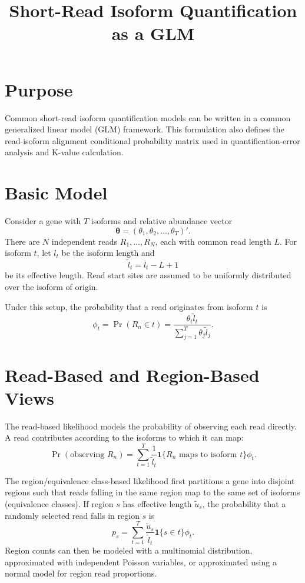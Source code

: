 \documentclass[11pt]{article}
\title{Short-Read Isoform Quantification as a GLM}
\author{}
\date{}
\begin{document}
\maketitle

\section*{Purpose}

Common short-read isoform quantification models can be written in a common
generalized linear model (GLM) framework. This formulation also defines the
read-isoform alignment conditional probability matrix used in
quantification-error analysis and K-value calculation.

\section*{Basic Model}

Consider a gene with \(T\) isoforms and relative abundance vector
\[
  \boldsymbol{\theta} = (\theta_1,\theta_2,\ldots,\theta_T)'.
\]
There are \(N\) independent reads \(R_1,\ldots,R_N\), each with common read
length \(L\). For isoform \(t\), let \(l_t\) be the isoform length and
\[
  \tilde{l}_t = l_t - L + 1
\]
be its effective length. Read start sites are assumed to be uniformly
distributed over the isoform of origin.

Under this setup, the probability that a read originates from isoform \(t\) is
\[
  \phi_t =
  \Pr(R_n \in t)
  =
  \frac{\theta_t \tilde{l}_t}
       {\sum_{j=1}^T \theta_j \tilde{l}_j}.
\]

\section*{Read-Based and Region-Based Views}

The read-based likelihood models the probability of observing each read
directly. A read contributes according to the isoforms to which it can map:
\[
  \Pr(\text{observing } R_n)
  =
  \sum_{t=1}^T
  \frac{1}{\tilde{l}_t}
  \mathbf{1}\{R_n \text{ maps to isoform } t\}
  \phi_t.
\]

The region/equivalence class-based likelihood first partitions a gene into disjoint regions such
that reads falling in the same region map to the same set of isoforms (equivalence classes). If region
\(s\) has effective length \(\tilde{u}_s\), the probability that a randomly
selected read falls in region \(s\) is
\[
  p_s =
  \sum_{t=1}^T
  \frac{\tilde{u}_s}{\tilde{l}_t}
  \mathbf{1}\{s \in t\}
  \phi_t.
\]
Region counts can then be modeled with a multinomial distribution, approximated
with independent Poisson variables, or approximated using a normal model for
region read proportions.
\end{document}
